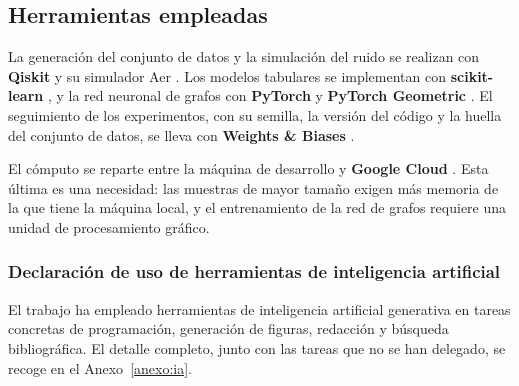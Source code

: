 \subsection{Herramientas empleadas}
\label{sec:herramientas}

La generación del conjunto de datos y la simulación del ruido se realizan con \textbf{Qiskit}
y su simulador Aer \cite{javadi2024qiskit}. Los modelos tabulares se implementan con
\textbf{scikit-learn} \cite{pedregosa2011scikit}, y la red neuronal de grafos con
\textbf{PyTorch} \cite{paszke2019pytorch} y \textbf{PyTorch Geometric}
\cite{fey2019pyg}. El seguimiento de los experimentos, con su semilla, la versión del código
y la huella del conjunto de datos, se lleva con \textbf{Weights \& Biases}
\cite{biewald2020wandb}.

El cómputo se reparte entre la máquina de desarrollo y \textbf{Google Cloud}
\cite{google2026cloud}. Esta última es una necesidad: las muestras de
mayor tamaño exigen más memoria de la que tiene la máquina local, y el entrenamiento de la
red de grafos requiere una unidad de procesamiento gráfico.

\subsubsection{Declaración de uso de herramientas de inteligencia artificial}
El trabajo ha empleado herramientas de inteligencia artificial generativa en tareas concretas
de programación, generación de figuras, redacción y búsqueda bibliográfica. El detalle
completo, junto con las tareas que no se han delegado, se recoge en el Anexo~\ref{anexo:ia}.
